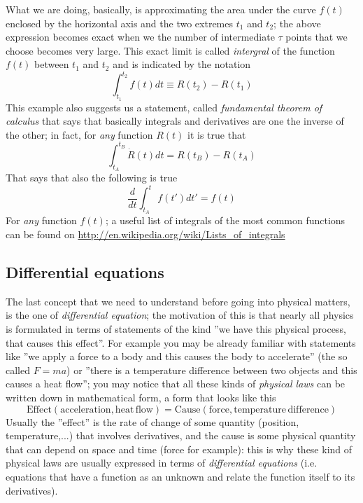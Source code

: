 \documentclass[11pt, a4paper,oneside,openright]{book}
\numberwithin{equation}{section}
\begin{document}
What we are doing, basically, is approximating the area under the curve $f(t)$ enclosed by the horizontal axis and the two extremes $t_1$ and $t_2$; the above expression becomes exact when we the number of intermediate $\tau$ points that we choose becomes very large. This exact limit is called \textit{intergral} of the function $f(t)$ between $t_1$ and $t_2$ and is indicated by the notation
\begin{equation}
\int_{t_1}^{t_2}f(t)dt\equiv R(t_2)-R(t_1)
\end{equation}
This example also suggests us a statement, called \textit{fundamental theorem of calculus} that says that basically integrals and derivatives are one the inverse of the other; in fact, for \textit{any} function $R(t)$ it is true that
\begin{equation}
\int_{t_A}^{t_B}\dot{R}(t)dt=R(t_B)-R(t_A)
\end{equation}
That says that also the following is true
\begin{equation}
\frac{d}{dt}\int_{t_A}^t f(t')dt'=f(t)
\end{equation}
For \textit{any} function $f(t)$; a useful list of integrals of the most common functions can be found on \url{http://en.wikipedia.org/wiki/Lists_of_integrals}
\subsection{Differential equations}
The last concept that we need to understand before going into physical matters, is the one of \textit{differential equation}; the motivation of this is that nearly all physics is formulated in terms of statements of the kind ''we have this physical process, that causes this effect''. For example you may be already familiar with statements like ''we apply a force to a body and this causes the body to accelerate'' (the so called $F=ma$) or ''there is a temperature difference between two objects and this causes a heat flow''; you may notice that all these kinds of \textit{physical laws} can be written down in mathematical form, a form that looks like this 
\begin{equation}
\label{concept}
\mathrm{Effect(acceleration,heat \,flow)}=\mathrm{Cause(force,temperature \,difference)}
\end{equation} 
Usually the ''effect'' is the rate of change of some quantity (position, temperature,...) that involves derivatives, and the cause is some physical quantity that can depend on space and time (force for example): this is why these kind of physical laws are usually expressed in terms of \textit{differential equations} (i.e. equations that have a function as an unknown and relate the function itself to its derivatives). 
\end{document}
